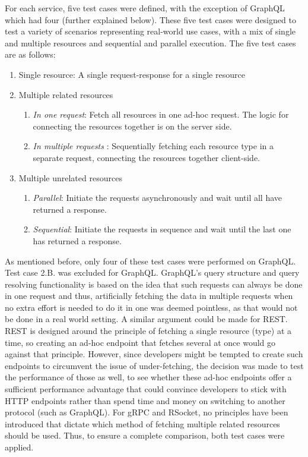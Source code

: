 For each service, five test cases were defined, with the exception of GraphQL which had four (further explained below). These five test cases were designed to test a variety of scenarios representing real-world use cases, with a mix of single and multiple resources and sequential and parallel execution. The five test cases are as follows:
\begin{enumerate}
    \item Single resource: A single request-response for a single resource
    \item Multiple related resources
    \begin{enumerate}
        \item \textit{In one request}: Fetch all resources in one ad-hoc request. The logic for connecting the resources together is on the server side.
        \item \textit{In multiple requests} : Sequentially fetching each resource type in a separate request, connecting the resources together client-side.
    \end{enumerate}
    \item Multiple unrelated resources
    \begin{enumerate}
        \item \textit{Parallel}: Initiate the requests asynchronously and wait until all have returned a response.
        \item \textit{Sequential}: Initiate the requests in sequence and wait until the last one has returned a response.
    \end{enumerate}
\end{enumerate}
As mentioned before, only four of these test cases were performed on GraphQL. Test case 2.B. was excluded for GraphQL. GraphQL's query structure and query resolving functionality is based on the idea that such requests can always be done in one request and thus, artificially fetching the data in multiple requests when no extra effort is needed to do it in one was deemed pointless, as that would not be done in a real world setting.
A similar argument could be made for REST. REST is designed around the principle of fetching a single resource (type) at a time, so creating an ad-hoc endpoint that fetches several at once would go against that principle. However, since developers might be tempted to create such endpoints to circumvent the issue of under-fetching, the decision was made to test the performance of those as well, to see whether these ad-hoc endpoints offer a sufficient performance advantage that could convince developers to stick with HTTP endpoints rather than spend time and money on switching to another protocol (such as GraphQL).
For gRPC and RSocket, no principles have been introduced that dictate which method of fetching multiple related resources should be used. Thus, to ensure a complete comparison, both test cases were applied.


